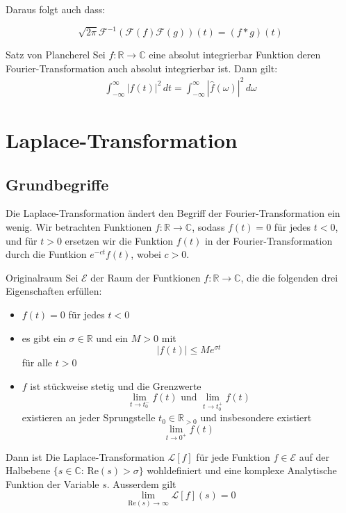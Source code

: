 \documentclass[a4paper,10pt]{article}
\def\Re{\text{Re}}
\begin{document}
Daraus folgt auch dass:

\begin{equation*}
  \sqrt{2\pi}\mathcal{F}^{-1}(\mathcal{F}(f)\mathcal{F}(g))(t)=(f*g)(t)
\end{equation*}

\begin{subbox}{Satz von Plancherel}
  Sei \(f\colon\mathbb{R}\to\mathbb{C}\) eine absolut integrierbar Funktion deren Fourier-Transformation auch absolut integrierbar ist. Dann gilt: \begin{align*} \int_{-\infty}^{\infty} |f(t)|^2 \,dt = \int_{-\infty}^{\infty} |\hat{f}(\omega )|^2\,d\omega \end{align*}
\end{subbox}

\section{Laplace-Transformation}

\subsection{Grundbegriffe}

Die Laplace-Transformation ändert den Begriff der Fourier-Transformation ein wenig. Wir betrachten Funktionen \(f\colon\mathbb{R}\to\mathbb{C}\), sodass \(f(t)=0\) für jedes \(t<0\), und für \(t>0\) ersetzen wir die Funktion \(f(t)\) in der Fourier-Transformation durch die Funtkion \(e^{-ct}f(t)\), wobei \(c>0\).

\begin{subbox}{Originalraum}
  Sei \(\mathcal{E}\) der Raum der Funtkionen \(f\colon\mathbb{R}\to\mathbb{C}\), die die folgenden drei Eigenschaften erfüllen:
  \begin{itemize}
    \item \(f(t)=0\) für jedes \(t<0\)
    \item es gibt ein \(\sigma\in\mathbb{R}\) und ein \(M>0\) mit \begin{equation*} |f(t)|\leq Me^{\sigma t} \end{equation*} für alle \(t>0\)
    \item{
      \(f\) ist stückweise stetig und die Grenzwerte \begin{equation*} \lim_{t\to t_0^-}f(t)\text{ und }\lim_{t\to t_0^+}f(t) \end{equation*} existieren an jeder Sprungstelle \(t_0\in\mathbb{R}_{>0}\) und insbesondere existiert \begin{equation*} \lim_{t\to 0^+}f(t) \end{equation*}
    }
  \end{itemize}

Dann ist Die Laplace-Transformation \(\mathcal{L}[f]\) für jede Funktion \(f\in \mathcal{E}\) auf der Halbebene \(\{s\in\mathbb{C}:\,\Re (s)>\sigma\}\) wohldefiniert und eine komplexe Analytische Funktion der Variable \(s\). Ausserdem gilt \begin{equation*} \lim_{\Re (s)\to\infty}\mathcal{L}[f](s)=0 \end{equation*}
\end{subbox}
\end{document}

